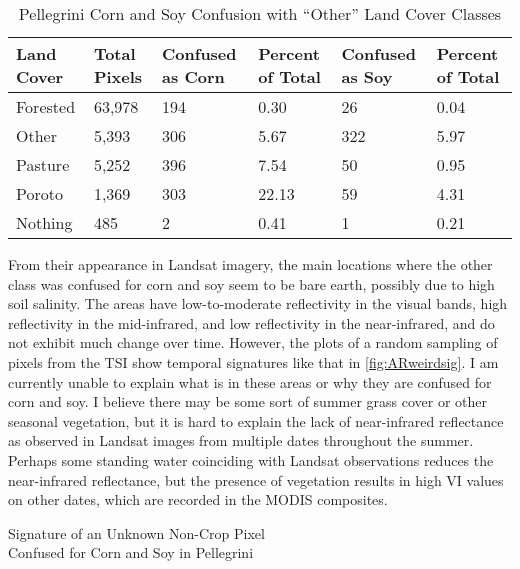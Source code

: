 \begin{table}[b]
  \begin{Spacing}{1.0}
  \centering
  \caption{Pellegrini Corn and Soy Confusion with ``Other'' Land Cover Classes}
  \label{table:ARotherconfusion}
  \begin{tabu}{X[0.6,m,c]X[0.5,m,c]|X[1,m,c]X[0.55,m,c]|X[1,m,c]X[0.55,m,c]}
    \toprule
    \textbf{Land Cover} & \textbf{Total Pixels} & \textbf{Confused as Corn} & \textbf{Percent of Total} & \textbf{Confused as Soy} & \textbf{Percent of Total} \\
    \midrule
    Forested & 63,978 & 194 & 0.30 & 26 & 0.04 \\
    Other & 5,393 & 306 & 5.67 & 322 & 5.97 \\
    Pasture & 5,252 & 396 & 7.54 & 50 & 0.95 \\
    Poroto & 1,369 & 303 & 22.13 & 59 & 4.31 \\
    Nothing & 485 & 2 & 0.41 & 1 & 0.21 \\
    \bottomrule
  \end{tabu}
  \end{Spacing}
\end{table}

From their appearance in Landsat imagery, the main locations where the other class was confused for corn and soy seem to be bare earth, possibly due to high soil salinity. The areas have low-to-moderate reflectivity in the visual bands, high reflectivity in the mid-infrared, and low reflectivity in the near-infrared, and do not exhibit much change over time. However, the plots of a random sampling of pixels from the TSI show temporal signatures like that in \autoref{fig:ARweirdsig}.
I am currently unable to explain what is in these areas or why they are confused for corn and soy. I believe there may be some sort of summer grass cover or other seasonal vegetation, but it is hard to explain the lack of near-infrared reflectance as observed in Landsat images from multiple dates throughout the summer. Perhaps some standing water coinciding with Landsat observations reduces the near-infrared reflectance, but the presence of vegetation results in high VI values on other dates, which are recorded in the MODIS composites.

\begin{ssfigure}
  \centering
  
  \caption[Signature of an Unknown Non-Crop Pixel Confused for Corn and Soy in Pellegrini]{Signature of an Unknown Non-Crop Pixel\\Confused for Corn and Soy in Pellegrini}
  \label{fig:ARweirdsig}
\end{ssfigure}



